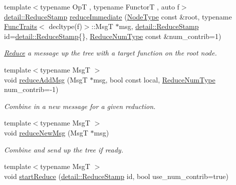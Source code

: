 \begin{DoxyCompactItemize}
{\footnotesize template$<$typename OpT , typename FunctorT , auto f$>$ }\\\hyperlink{namespacevt_1_1collective_1_1reduce_1_1detail_aacc1fcd729d934ba143fee3a943bf9e7}{detail\+::\+Reduce\+Stamp} \hyperlink{structvt_1_1collective_1_1reduce_1_1_reduce_ad5b5b32dbde405974970f5bdbd24d5d9}{reduce\+Immediate} (\hyperlink{namespacevt_a866da9d0efc19c0a1ce79e9e492f47e2}{Node\+Type} const \&root, typename \hyperlink{structvt_1_1_func_traits}{Func\+Traits}$<$ decltype(f)$>$\+::MsgT $\ast$msg, \hyperlink{namespacevt_1_1collective_1_1reduce_1_1detail_aacc1fcd729d934ba143fee3a943bf9e7}{detail\+::\+Reduce\+Stamp} id=\hyperlink{namespacevt_1_1collective_1_1reduce_1_1detail_aacc1fcd729d934ba143fee3a943bf9e7}{detail\+::\+Reduce\+Stamp}\{\}, \hyperlink{structvt_1_1collective_1_1reduce_1_1_reduce_a6c3e63aca10c31d2823b0b18cf9762a4}{Reduce\+Num\+Type} const \&num\+\_\+contrib=1)
\begin{DoxyCompactList}\small\item\em \hyperlink{structvt_1_1collective_1_1reduce_1_1_reduce}{Reduce} a message up the tree with a target function on the root node. \end{DoxyCompactList}\item 
{\footnotesize template$<$typename MsgT $>$ }\\void \hyperlink{structvt_1_1collective_1_1reduce_1_1_reduce_a18df32ceadd6b55979c8fd7e85f613e4}{reduce\+Add\+Msg} (MsgT $\ast$msg, bool const local, \hyperlink{structvt_1_1collective_1_1reduce_1_1_reduce_a6c3e63aca10c31d2823b0b18cf9762a4}{Reduce\+Num\+Type} num\+\_\+contrib=-\/1)
\begin{DoxyCompactList}\small\item\em Combine in a new message for a given reduction. \end{DoxyCompactList}\item 
{\footnotesize template$<$typename MsgT $>$ }\\void \hyperlink{structvt_1_1collective_1_1reduce_1_1_reduce_a0642df1a1e52d7da269d8fb23dfc193f}{reduce\+New\+Msg} (MsgT $\ast$msg)
\begin{DoxyCompactList}\small\item\em Combine and send up the tree if ready. \end{DoxyCompactList}\item 
{\footnotesize template$<$typename MsgT $>$ }\\void \hyperlink{structvt_1_1collective_1_1reduce_1_1_reduce_ad8849fa013a4b3e3f795ceeb103026e4}{start\+Reduce} (\hyperlink{namespacevt_1_1collective_1_1reduce_1_1detail_aacc1fcd729d934ba143fee3a943bf9e7}{detail\+::\+Reduce\+Stamp} id, bool use\+\_\+num\+\_\+contrib=true)

\end{DoxyCompactItemize}
